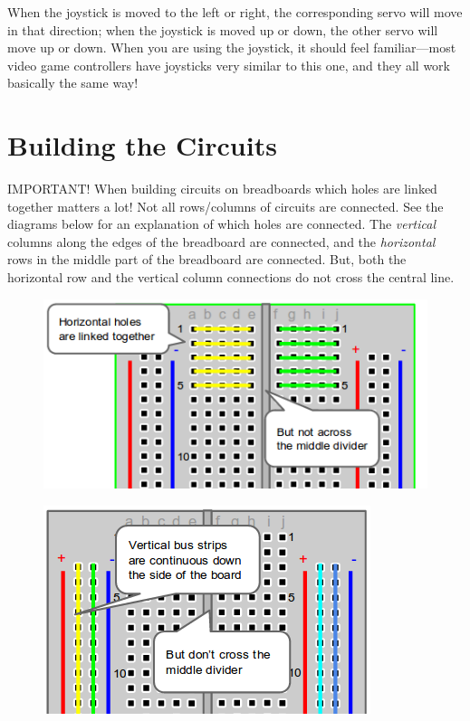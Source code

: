 \documentclass{article}
\begin{document}
When the joystick is moved to the left or right, the corresponding servo will move in
that direction; when the joystick is moved up or down, the other servo will move up
or down. When you are using the joystick, it should feel familiar---most video game
controllers have joysticks very similar to this one, and they all work basically the
same way!

\section{Building the Circuits}
IMPORTANT! When building circuits on breadboards which holes are linked together
matters a lot! Not all rows/columns of circuits are connected. See the diagrams below
for an explanation of which holes are connected. The \emph{vertical} columns along
the edges of the breadboard are connected, and the \emph{horizontal} rows in the
middle part of the breadboard are connected. But, both the horizontal row and the
vertical column connections do not cross the central line.

    \begin{figure}[H]
      \centering
      \includegraphics[width=\textwidth]{figures/breadboard-connectivity1.png}
      \caption{\label{fig:breadboard-connectivity1}}
    \end{figure}

    \begin{figure}[H]
      \centering
      \includegraphics[width=\textwidth]{figures/breadboard-connectivity2.png}
      \caption{\label{fig:breadboard-connectivity2}}
    \end{figure}
\end{document}
